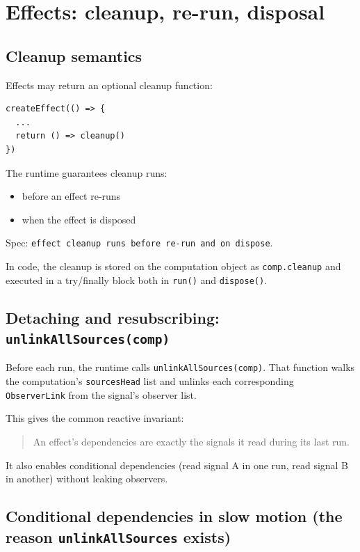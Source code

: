 \section{Effects: cleanup, re-run, disposal}

\subsection{Cleanup semantics}

Effects may return an optional cleanup function:

\begin{verbatim}
createEffect(() => {
  ...
  return () => cleanup()
})
\end{verbatim}

The runtime guarantees cleanup runs:

\begin{itemize}
  \item before an effect re-runs
  \item when the effect is disposed
\end{itemize}

Spec: \texttt{effect cleanup runs before re-run and on dispose}.

In code, the cleanup is stored on the computation object as \texttt{comp.cleanup} and executed in a try/finally block both in \texttt{run()} and \texttt{dispose()}.

\subsection{Detaching and resubscribing: \texttt{unlinkAllSources(comp)}}

Before each run, the runtime calls \texttt{unlinkAllSources(comp)}.
That function walks the computation's \texttt{sourcesHead} list and unlinks each corresponding \texttt{ObserverLink} from the signal's observer list.

This gives the common reactive invariant:

\begin{quote}
An effect's dependencies are exactly the signals it read during its last run.
\end{quote}

It also enables conditional dependencies (read signal A in one run, read signal B in another) without leaking observers.

\subsection{Conditional dependencies in slow motion (the reason \texttt{unlinkAllSources} exists)}

